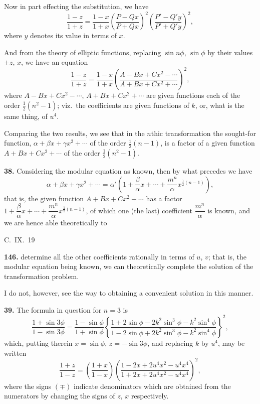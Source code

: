 \documentclass[11pt,a4paper]{book}
\begin{document}
Now in part effecting the substitution, we have
\[
\frac{1 - z}{1 + z} = \frac{1 - x}{1 + x}\left(\frac{P - Qx}{P + Qx}\right)^2\left(\frac{P' - Q'y}{P' + Q'y}\right)^2,
\]
where $y$ denotes its value in terms of $x$.

And from the theory of elliptic functions, replacing $\sin n\phi$, $\sin\phi$ by their values $\pm z$, $x$, we have an equation
\[
\frac{1 - z}{1 + z} = \frac{1 - x}{1 + x}\left(\frac{A - Bx + Cx^2 - \cdots}{A + Bx + Cx^2 + \cdots}\right)^2,
\]
where $A - Bx + Cx^2 - \cdots$, $A + Bx + Cx^2 + \cdots$ are given functions each of the order $\frac{1}{2}(n^2 - 1)$; viz.\ the coefficients are given functions of $k$, or, what is the same thing, of $u^4$.

Comparing the two results, we see that in the $n$thic transformation the sought-for function, $\alpha + \beta x + \gamma x^2 + \cdots$ of the order $\frac{1}{2}(n - 1)$, is a factor of a given function $A + Bx + Cx^2 + \cdots$ of the order $\frac{1}{2}(n^2 - 1)$.

\medskip
\noindent\textbf{38.} Considering the modular equation as known, then by what precedes we have
\[
\alpha + \beta x + \gamma x^2 + \cdots = \alpha'\left(1 + \frac{\beta}{\alpha}x + \cdots + \frac{m^n}{\alpha}x^{\frac{1}{2}(n-1)}\right),
\]
that is, the given function $A + Bx + Cx^2 + \cdots$ has a factor $1 + \dfrac{\beta}{\alpha}x + \cdots + \dfrac{m^n}{\alpha}x^{\frac{1}{2}(n-1)}$, of which one (the last) coefficient $\dfrac{m^n}{\alpha}$ is known, and we are hence able theoretically to

\begin{flushright}
C.~IX.~19
\end{flushright}


\noindent\textbf{146.} determine all the other coefficients rationally in terms of $u$, $v$; that is, the modular equation being known, we can theoretically complete the solution of the transformation problem.

I do not, however, see the way to obtaining a convenient solution in this manner.

\medskip
\noindent\textbf{39.} The formula in question for $n = 3$ is
\[
\frac{1 + \sin 3\phi}{1 - \sin 3\phi} = \frac{1 - \sin\phi}{1 + \sin\phi}\left\{\frac{1 + 2\sin\phi - 2k^2\sin^3\phi - k^2\sin^4\phi}{1 - 2\sin\phi + 2k^2\sin^3\phi - k^2\sin^4\phi}\right\}^2,
\]
which, putting therein $x = \sin\phi$, $z = -\sin 3\phi$, and replacing $k$ by $u^4$, may be written
\[
\frac{1 + z}{1 - z} = \left(\frac{1 + x}{1 - x}\right)\left(\frac{1 - 2x + 2u^4x^2 - u^4x^4}{1 + 2x + 2u^4x^2 - u^4x^4}\right)^2,
\]
where the signs $(\mp)$ indicate denominators which are obtained from the numerators by changing the signs of $z$, $x$ respectively.
\end{document}
